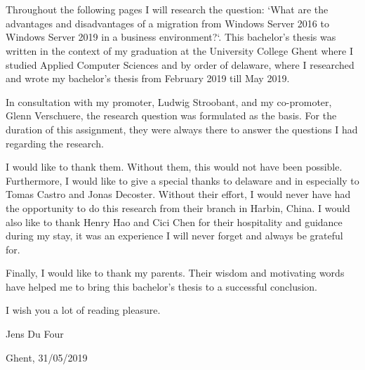 
\chapter*{}
\label{ch:voorwoord}

Throughout the following pages I will research the question: `What are the advantages and disadvantages of a migration from Windows Server 2016 to Windows Server 2019 in a business environment?`. 
This bachelor's thesis was written in the context of my graduation at the University College Ghent where I studied Applied Computer Sciences and by order of delaware, where I researched and wrote my bachelor's thesis from February 2019 till May 2019.

In consultation with my promoter, Ludwig Stroobant, and my co-promoter, Glenn Verschuere, the research question was formulated as the basis. 
For the duration of this assignment, they were always there to answer the questions I had regarding the research. 

I would like to thank them. 
Without them, this would not have been possible.
Furthermore, I would like to give a special thanks to delaware and in especially to Tomas Castro and Jonas Decoster. 
Without their effort, I would never have had the opportunity to do this research from their branch in Harbin, China.
I would also like to thank Henry Hao and Cici Chen for their hospitality and guidance during my stay, it was an experience I will never forget and always be grateful for. 

Finally, I would like to thank my parents. Their wisdom and motivating words have helped me to bring this bachelor's thesis to a successful conclusion.

I wish you a lot of reading pleasure.

Jens Du Four

Ghent, 31/05/2019